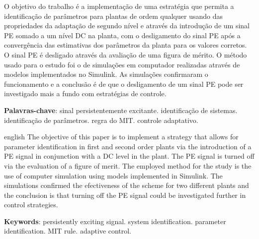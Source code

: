 \documentclass[
	12pt,				%
	openright,			%
	twoside,			%
	a4paper,			%
	english,			%
	french,				%
	spanish,			%
	brazil				%
	]{abntex2}
\begin{document}

\setlength{\absparsep}{18pt} %
\begin{resumo}
\thispagestyle{simple}
 
 O objetivo do trabalho é a implementação de uma estratégia que permita a identificação de parâmetros para plantas de ordem qualquer usando das propriedades da adaptação de segundo nível e através da introdução de um sinal PE somado a um nível DC na planta, com o desligamento do sinal PE após a convergência das estimativas dos parâmetros da planta para os valores corretos. O sinal PE é desligado através da avaliação de uma figura de mérito.  O método usado para o estudo foi o de simulações em computador realizadas através de modelos implementados no Simulink. As simulações confirmaram o funcionamento e a conclusão é de que o desligamento de um sinal PE pode ser investigado mais a fundo com estratégias de controle.

 \textbf{Palavras-chave}: sinal persistentemente excitante. identificação de sistemas. identificação de parâmetros. regra do MIT. controle adaptativo.
\end{resumo}

\begin{resumo}[Abstract]
\thispagestyle{simple}
 \begin{otherlanguage*}{english}
   The objective of this paper is to implement a strategy that allows for parameter identification in first and second order plants via the introduction of a PE signal in conjunction with a DC level in the plant. The PE signal is turned off via the evaluation of a figure of merit. The employed method for the study is the use of computer simulation using models implemented in Simulink. The simulations confirmed the efectiveness of the scheme for two different plants and the conclusion is that turning off the PE signal could be investigated further in control strategies.

   \vspace{\onelineskip}
 
   \noindent 
   \textbf{Keywords}: persistently exciting signal. system identification. parameter identification. MIT rule. adaptive control.
 \end{otherlanguage*}
\end{resumo}

\listoffigures* %
\thispagestyle{simple}
\end{document}

